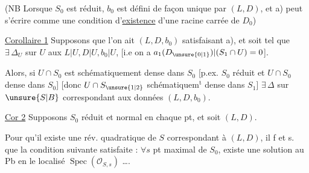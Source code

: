 (NB Lorsque $S_0$ est réduit, $b_0$ est défini de façon unique par $(L,D)$, et a) peut s'écrire comme une condition d'\uline{existence} d'une racine carrée de $D_0$)

\uline{Corollaire 1} Supposons que l'on ait $(L,D,b_0)$ satisfaisant a), et soit   tel que   $\exists\,\Delta_U$ sur $U$   aux   $L|U,D|U,b_0|U$, [i.e on a $a_1(D_{\unsure{0|1}})|(S_1\cap U)=0$].

Alors, si $U\cap S_0$ est schématiquement dense dans $S_0$ [p.ex. $S_0$ réduit et $U\cap S_0$ dense dans $S_0$] [donc $U\cap S_{\unsure{1|2}}$ schématiquem$^{\mathrm t}$ dense dans $S_1$]  $\exists\,\Delta$ sur $\unsure{S|B}$ correspondant aux données $(L,D,b_0)$.

\uline{Cor 2}  Supposons $S_0$ réduit et normal en chaque pt, et soit $(L,D)$. 

Pour qu'il existe une  rév. quadratique de $S$ correspondant à $(L,D)$, il f et s. que la condition suivante  satisfaite : $\forall s$ pt maximal de $S_0$, existe une solution au Pb en le localisé $\operatorname{Spec}(\mathcal O_{S,s})$ \ldots.
